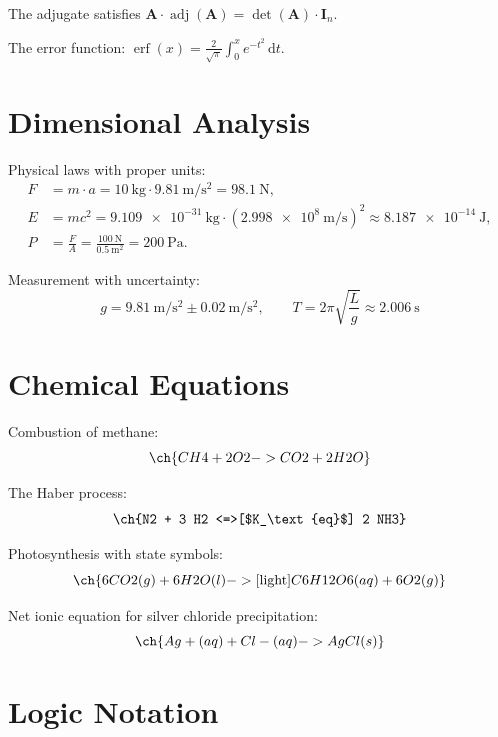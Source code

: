 \documentclass[
    language=english,
    doctype=article,
    institution=none,
    titlestyle=book,
]{../../omnilatex}
\DeclareMathOperator{\adj}{adj}
\DeclareMathOperator{\erf}{erf}
\theoremstyle{plain}
\theoremstyle{definition}
\theoremstyle{remark}
\begin{document}
The adjugate satisfies $\mathbf{A} \cdot \adj(\mathbf{A}) = \det(\mathbf{A}) \cdot \mathbf{I}_n$.

The error function: $\erf(x) = \frac{2}{\sqrt{\pi}} \int_0^x e^{-t^2}\,\mathup{d}t$.

\section{Dimensional Analysis}
\label{sec:dimensional-analysis}

Physical laws with proper units:
\begin{align}
    F &= m \cdot a = \qty{10}{\kilo\gram} \cdot \qty{9.81}{\meter\per\second\squared}
        = \qty{98.1}{\newton}, \label{eq:newton}\\
    E &= m c^2 = \qty{9.109e-31}{\kilo\gram} \cdot (\qty{2.998e8}{\meter\per\second})^2
        \approx \qty{8.187e-14}{\joule}, \label{eq:einstein}\\
    P &= \frac{F}{A} = \frac{\qty{100}{\newton}}{\qty{0.5}{\meter\squared}}
        = \qty{200}{\pascal}. \label{eq:pressure}
\end{align}

Measurement with uncertainty:
\[
    g = \qty{9.81}{\meter\per\second\squared} \pm \qty{0.02}{\meter\per\second\squared}, \qquad
    T = 2\pi\sqrt{\frac{L}{g}} \approx \qty{2.006}{\second}
\]

\section{Chemical Equations}
\label{sec:chemical-equations}

Combustion of methane:
\[
    \ch{CH4 + 2 O2 -> CO2 + 2 H2O}
\]

The Haber process:
\[
    \ch{N2 + 3 H2 <=>[$K_\text{eq}$] 2 NH3}
\]

Photosynthesis with state symbols:
\[
    \ch{6 CO2(g) + 6 H2O(l) ->[\text{light}] C6H12O6(aq) + 6 O2(g)}
\]

Net ionic equation for silver chloride precipitation:
\[
    \ch{Ag+(aq) + Cl-(aq) -> AgCl(s)}
\]

\section{Logic Notation}
\label{sec:logic}
\end{document}
